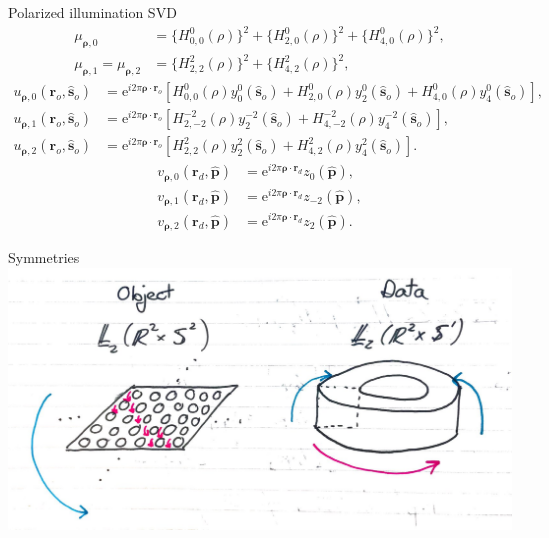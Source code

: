 \documentclass[presentation]{beamer}
\newcommand{\me}{\mathrm{e}}
\providecommand{\ro}[1]{\mathbf{\mathbf{r}}_o}
\providecommand{\so}[1]{\mathbf{\hat{s}}_o}
\providecommand{\rd}[1]{\mathbf{r}_d}
\providecommand{\mh}[1]{\mathbf{\hat{#1}}}
\providecommand{\bs}[1]{\boldsymbol{#1}}
\begin{document}
\begin{frame}{Polarized illumination SVD}
\begin{align*}
  \mu_{\bs{\rho},0} &= \{H_{0,0}^{0}(\rho)\}^2 + \{H_{2,0}^{0}(\rho)\}^2 + \{H_{4,0}^{0}(\rho)\}^2,\\
  \mu_{\bs{\rho},1} = \mu_{\bs{\rho},2} &= \{H_{2,2}^{2}(\rho)\}^2 + \{H_{4,2}^{2}(\rho)\}^2,
\end{align*}
\begin{align*}
  u_{\bs{\rho},0}(\ro{}, \so{}) &= \me{}^{i2\pi\bs{\rho}\cdot\ro{}}[H_{0,0}^0(\rho)y_0^0(\so{}) + H_{2,0}^0(\rho)y_2^0(\so{}) + H_{4,0}^0(\rho)y_4^0(\so{})],\\
  u_{\bs{\rho},1}(\ro{}, \so{}) &= \me{}^{i2\pi\bs{\rho}\cdot\ro{} }[H_{2,-2}^{-2}(\rho)y_2^{-2}(\so{}) + H_{4,-2}^{-2}(\rho)y_4^{-2}(\so{})],\\
  u_{\bs{\rho},2}(\ro{}, \so{}) &= \me{}^{i2\pi\bs{\rho}\cdot\ro{} }[H_{2,2}^2(\rho)y_2^2(\so{}) + H_{4,2}^2(\rho)y_4^2(\so{})].
    \end{align*}
\begin{align*}
  v_{\bs{\rho},0}(\rd{}, \mh{p}) &= \me{}^{i2\pi\bs{\rho}\cdot\rd{}}z_0(\mh{p}),\\
  v_{\bs{\rho},1}(\rd{}, \mh{p}) &= \me{}^{i2\pi\bs{\rho}\cdot\rd{}}z_{-2}(\mh{p}),\\
  v_{\bs{\rho},2}(\rd{}, \mh{p}) &= \me{}^{i2\pi\bs{\rho}\cdot\rd{}}z_2(\mh{p}).
\end{align*}
\end{frame}

\begin{frame}[label=sec-1]{Symmetries}
      \centering
      \includegraphics[width=1.0\columnwidth]{symmetry.pdf}
\end{frame}




  
\end{document}
